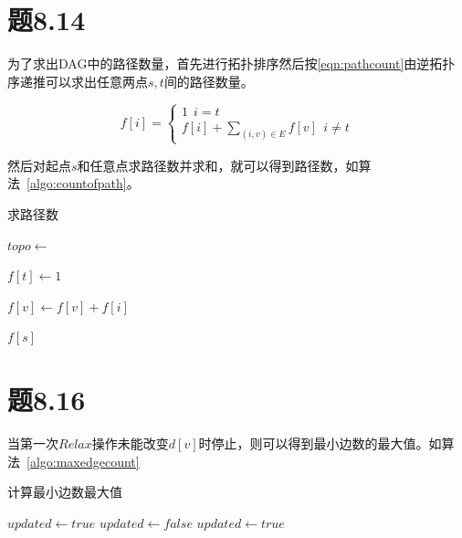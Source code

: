 \documentclass[a4paper,twoside]{article}
\begin{document}
\begin{spacing}{1.2}
\section{题8.14}

为了求出DAG中的路径数量，首先进行拓扑排序然后按\eqref{eqn:pathcount}由逆拓扑序递推可以求出任意两点$s, t$间的路径数量。

\begin{equation}
	\label{eqn:pathcount}
	f[i]=
	\begin{cases}
		1 \ \ i=t \\
		f[i]+\sum_{(i,v)\in E} f[v] \ \ i\neq t
	\end{cases}
\end{equation}

然后对起点$s$和任意点求路径数并求和，就可以得到路径数，如算法~\ref{algo:countofpath}。

\begin{algorithm}
	\caption{求路径数}
	\label{algo:countofpath}
	\begin{algorithmic}[1]		
		\State $topo\gets$ 

		\State $f[t]\gets 1$

				\State $f[v]\gets f[v]+f[i]$
			\EndFor
		\EndFor

		\State \Return $f[s]$

		\EndProcedure
	\end{algorithmic}
\end{algorithm}	

\section{题8.16}

当第一次$Relax$操作未能改变$d[v]$时停止，则可以得到最小边数的最大值。如算法~\ref{algo:maxedgecount}

\begin{algorithm}
	\caption{计算最小边数最大值}
	\label{algo:maxedgecount}
	\begin{algorithmic}[1]		
		\State {}
		\State $updated\gets true$
			\State $updated\gets false$
					\State {}
					\State $updated\gets true$
				\EndIf
			\EndFor
		\EndWhile
		\EndProcedure
	\end{algorithmic}
\end{algorithm}


\end{spacing}
\end{document}
